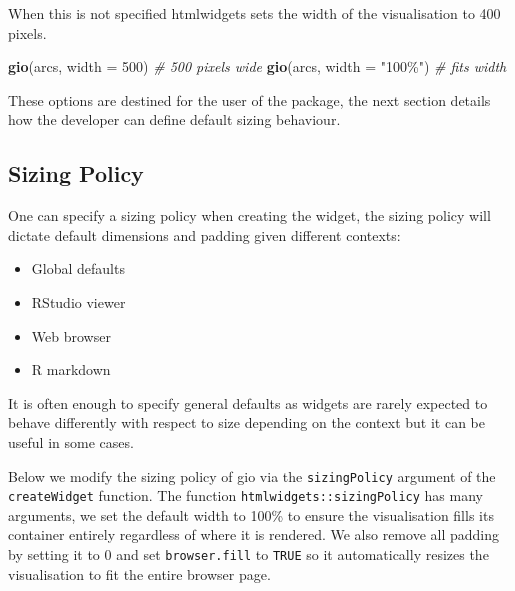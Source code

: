 \documentclass[
]{krantz}
\makeatletter
\newenvironment{Shaded}{\begin{snugshade}}{\end{snugshade}}
\newcommand{\CommentTok}[1]{\textcolor[rgb]{0.37,0.37,0.37}{\textit{#1}}}
\newcommand{\DataTypeTok}[1]{\textcolor[rgb]{0.27,0.27,0.27}{#1}}
\newcommand{\DecValTok}[1]{\textcolor[rgb]{0.06,0.06,0.06}{#1}}
\newcommand{\KeywordTok}[1]{\textcolor[rgb]{0.27,0.27,0.27}{\textbf{#1}}}
\newcommand{\NormalTok}[1]{#1}
\newcommand{\StringTok}[1]{\textcolor[rgb]{0.5,0.5,0.5}{#1}}
\providecommand{\tightlist}{%
  \setlength{\itemsep}{0pt}\setlength{\parskip}{0pt}}
\newenvironment{kframe}{%
\medskip{}
\setlength{\fboxsep}{.8em}
 \def\at@end@of@kframe{}%
 \ifinner\ifhmode%
  \def\at@end@of@kframe{\end{minipage}}%
  \begin{minipage}{\columnwidth}%
 \fi\fi%
 \def\FrameCommand##1{\hskip\@totalleftmargin \hskip-\fboxsep
 \colorbox{shadecolor}{##1}\hskip-\fboxsep
     \hskip-\linewidth \hskip-\@totalleftmargin \hskip\columnwidth}%
 \MakeFramed {\advance\hsize-\width
   \@totalleftmargin\z@ \linewidth\hsize
   \@setminipage}}%
 {\par\unskip\endMakeFramed%
 \at@end@of@kframe}
\renewenvironment{Shaded}{\begin{kframe}}{\end{kframe}}
\makeatother
\begin{document}
When this is not specified htmlwidgets sets the width of the visualisation to 400 pixels.

\begin{Shaded}
\begin{Highlighting}[]
\KeywordTok{gio}\NormalTok{(arcs, }\DataTypeTok{width =} \DecValTok{500}\NormalTok{) }\CommentTok{\# 500 pixels wide}
\KeywordTok{gio}\NormalTok{(arcs, }\DataTypeTok{width =} \StringTok{"100\%"}\NormalTok{) }\CommentTok{\# fits width}
\end{Highlighting}
\end{Shaded}

These options are destined for the user of the package, the next section details how the developer can define default sizing behaviour.

\hypertarget{widgets-adv-sizing-policy}{%
\subsection{Sizing Policy}\label{widgets-adv-sizing-policy}}

One can specify a sizing policy when creating the widget, the sizing policy will dictate default dimensions and padding given different contexts:

\begin{itemize}
\tightlist
\item
  Global defaults
\item
  RStudio viewer
\item
  Web browser
\item
  R markdown
\end{itemize}

It is often enough to specify general defaults as widgets are rarely expected to behave differently with respect to size depending on the context but it can be useful in some cases.

Below we modify the sizing policy of gio via the \texttt{sizingPolicy} argument of the \texttt{createWidget} function. The function \texttt{htmlwidgets::sizingPolicy} has many arguments, we set the default width to 100\% to ensure the visualisation fills its container entirely regardless of where it is rendered. We also remove all padding by setting it to 0 and set \texttt{browser.fill} to \texttt{TRUE} so it automatically resizes the visualisation to fit the entire browser page.
\end{document}
